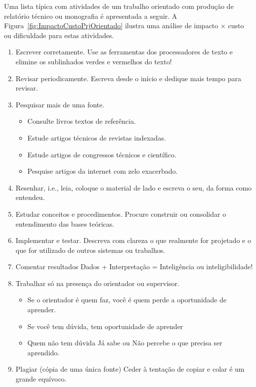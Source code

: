 \begin{example} \label{ex:ListaImpactoxCustoAtvPrjOrt}
	Uma lista típica com atividades  de um trabalho orientado com produção de relatório técnico ou monografia é apresentada a seguir. A Figura~\ref{fig:ImpactoCustoPrjOrientado} ilustra uma análise de impacto $\times$ custo ou dificuldade para estas atividades.
\begin{multicols}{2}
	\begin{enumerate}[noitemsep]
		\item Escrever corretamente.
		\subitem Use as ferramentas dos processadores de texto e elimine os sublinhados verdes e vermelhos do texto!
		\item Revisar periodicamente.
		\subitem Escreva desde o início e dedique mais tempo para revisar.
		\item Pesquisar mais de uma fonte.
		\begin{itemize}[noitemsep]
			\item Consulte livros textos de referência.
			\item Estude artigos técnicos de revistas indexadas.
			\item Estude artigos de congressos técnicos e científico.
			\item Pesquise artigos da internet com zelo exacerbado.
					\end{itemize}
		\item Resenhar, i.e., leia, coloque o material de lado e escreva o seu, da forma como entendeu. 
		\item Estudar conceitos e procedimentos.
		\subitem Procure construir ou consolidar o entendimento das bases teóricas.
		\item Implementar e testar.
		\subitem Descreva com clareza o que realmente for projetado e o que for utilizado de outros sistemas ou trabalhos.
		\item Comentar resultados
		\subitem Dados + Interpretação = Inteligência ou inteligibilidade! 
		\item Trabalhar só na presença do orientador ou supervisor.
		\begin{itemize}[noitemsep]
			\item Se o orientador é quem faz, você é quem perde a oportunidade de aprender.
			\item Se você tem dúvida, tem oportunidade de aprender
			\item Quem não tem dúvida 
			\subitem Já sabe ou
			\subitem Não percebe o que precisa ser aprendido.
		\end{itemize}
		\item Plagiar (cópia de uma única fonte)
		\subitem Ceder à tentação de copiar e colar é um grande equívoco.
	\end{enumerate}


\end{multicols}
\end{example}
